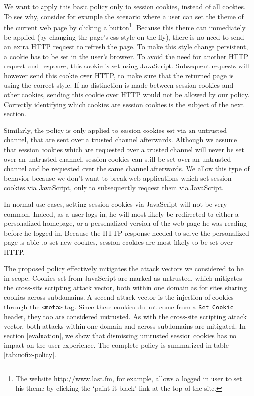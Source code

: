 We want to apply this basic policy only to \glspl{session cookie}, instead of all cookies. To see why, consider for example the scenario where a user can set the theme of the current web page by clicking a button\footnote{The website \url{http://www.last.fm}, for example, allows a logged in user to set his theme by clicking the `paint it black' link at the top of the site.}. Because this theme can immediately be applied (by changing the page's css style on the fly), there is no need to send an extra HTTP request to refresh the page. To make this style change persistent, a cookie has to be set in the user's browser. To avoid the need for another HTTP request and response, this cookie is set using JavaScript. Subsequent requests will however send this cookie over HTTP, to make sure that the returned page is using the correct style. If no distinction is made between session cookies and other cookies, sending this cookie over HTTP would not be allowed by our policy. Correctly identifying which cookies are session cookies is the subject of the next section.

Similarly, the policy is only applied to session cookies set via an untrusted channel, that are sent over a trusted channel afterwards. Although we assume that session cookies which are requested over a trusted channel will never be set over an untrusted channel, session cookies can still be set over an untrusted channel and be requested over the same channel afterwards. We allow this type of behavior because we don't want to break web applications which set session cookies via JavaScript, only to subsequently request them via JavaScript. 

In normal use cases, setting session cookies via JavaScript will not be very common. Indeed, as a user logs in, he will most likely be redirected to either a personalized homepage, or a personalized version of the web page he was reading before he logged in. Because the HTTP response needed to serve the personalized page is able to set new cookies, session cookies are most likely to be set over HTTP.

The proposed policy effectively mitigates the attack vectors we considered to be in scope. Cookies set from JavaScript are marked as untrusted, which mitigates the cross-site scripting attack vector, both within one domain as for sites sharing cookies across subdomains. A second attack vector is the injection of cookies through the \texttt{<meta>}-tag. Since these cookies do not come from a \texttt{Set-Cookie} header, they too are considered untrusted. As with the cross-site scripting attack vector, both attacks within one domain and across subdomains are mitigated. In section \ref{evaluation}, we show that dismissing untrusted session cookies has no impact on the user experience. The complete policy is summarized in table \ref{tab:nofix-policy}.

